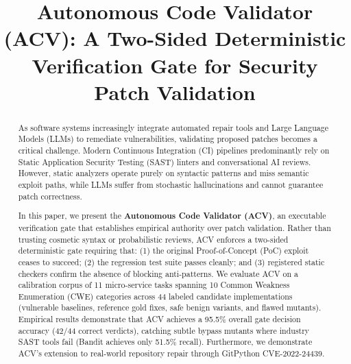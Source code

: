 \documentclass[conference]{IEEEtran}
\begin{document}
\title{Autonomous Code Validator (ACV): A Two-Sided Deterministic Verification Gate for Security Patch Validation}

\author{
    \vspace{0.5em}
}

\maketitle

\begin{abstract}
As software systems increasingly integrate automated repair tools and Large Language Models (LLMs) to remediate vulnerabilities, validating proposed patches becomes a critical challenge. Modern Continuous Integration (CI) pipelines predominantly rely on Static Application Security Testing (SAST) linters and conversational AI reviews. However, static analyzers operate purely on syntactic patterns and miss semantic exploit paths, while LLMs suffer from stochastic hallucinations and cannot guarantee patch correctness. 

In this paper, we present the \textbf{Autonomous Code Validator (ACV)}, an executable verification gate that establishes empirical authority over patch validation. Rather than trusting cosmetic syntax or probabilistic reviews, ACV enforces a two-sided deterministic gate requiring that: (1) the original Proof-of-Concept (PoC) exploit ceases to succeed; (2) the regression test suite passes cleanly; and (3) registered static checkers confirm the absence of blocking anti-patterns. We evaluate ACV on a calibration corpus of 11 micro-service tasks spanning 10 Common Weakness Enumeration (CWE) categories across 44 labeled candidate implementations (vulnerable baselines, reference gold fixes, safe benign variants, and flawed mutants). Empirical results demonstrate that ACV achieves a 95.5\% overall gate decision accuracy (42/44 correct verdicts), catching subtle bypass mutants where industry SAST tools fail (Bandit achieves only 51.5\% recall). Furthermore, we demonstrate ACV's extension to real-world repository repair through GitPython CVE-2022-24439.
\end{abstract}
\end{document}
